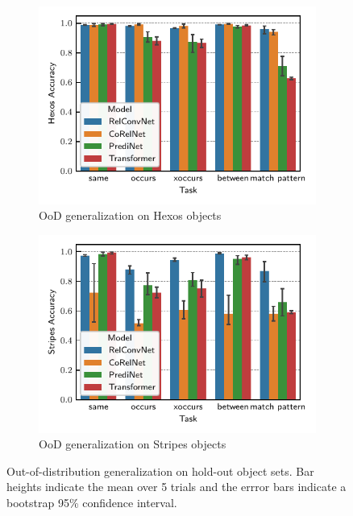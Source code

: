 \begin{figure}
    \centering
    \begin{subfigure}{0.45\textwidth}
        \centering
        \includegraphics[width=\textwidth]{figs/experiments/hexos_acc.pdf}
        \caption{OoD generalization on Hexos objects}\label{fig:ood_generalization_hexos}
    \end{subfigure}
    \begin{subfigure}{0.45\textwidth}
        \centering
        \includegraphics[width=\textwidth]{figs/experiments/stripes_acc.pdf}
        \caption{OoD generalization on Stripes objects}\label{fig:ood_generalization_stripes}
    \end{subfigure}
    \caption{Out-of-distribution generalization on hold-out object sets. Bar heights indicate the mean over 5 trials and the errror bars indicate a bootstrap 95\% confidence interval.}\label{fig:ood_generalization}
\end{figure}

